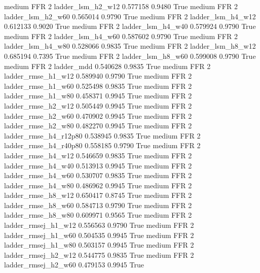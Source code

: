     medium      FFR                 2      ladder_lsm_h2_w12   0.577158      0.9480    True
    medium      FFR                 2      ladder_lsm_h2_w60   0.565014      0.9790    True
    medium      FFR                 2      ladder_lsm_h4_w12   0.612133      0.9020    True
    medium      FFR                 2      ladder_lsm_h4_w40   0.579924      0.9790    True
    medium      FFR                 2      ladder_lsm_h4_w60   0.587602      0.9790    True
    medium      FFR                 2      ladder_lsm_h4_w80   0.528066      0.9835    True
    medium      FFR                 2      ladder_lsm_h8_w12   0.685194      0.7395    True
    medium      FFR                 2      ladder_lsm_h8_w60   0.599008      0.9790    True
    medium      FFR                 2             ladder_mdd   0.540628      0.9835    True
    medium      FFR                 2     ladder_rmse_h1_w12   0.589940      0.9790    True
    medium      FFR                 2     ladder_rmse_h1_w60   0.525498      0.9835    True
    medium      FFR                 2     ladder_rmse_h1_w80   0.458371      0.9945    True
    medium      FFR                 2     ladder_rmse_h2_w12   0.505449      0.9945    True
    medium      FFR                 2     ladder_rmse_h2_w60   0.470902      0.9945    True
    medium      FFR                 2     ladder_rmse_h2_w80   0.482270      0.9945    True
    medium      FFR                 2  ladder_rmse_h4_r12p80   0.538945      0.9835    True
    medium      FFR                 2  ladder_rmse_h4_r40p80   0.558185      0.9790    True
    medium      FFR                 2     ladder_rmse_h4_w12   0.546659      0.9835    True
    medium      FFR                 2     ladder_rmse_h4_w40   0.513913      0.9945    True
    medium      FFR                 2     ladder_rmse_h4_w60   0.530707      0.9835    True
    medium      FFR                 2     ladder_rmse_h4_w80   0.486962      0.9945    True
    medium      FFR                 2     ladder_rmse_h8_w12   0.650417      0.8745    True
    medium      FFR                 2     ladder_rmse_h8_w60   0.584713      0.9790    True
    medium      FFR                 2     ladder_rmse_h8_w80   0.609971      0.9565    True
    medium      FFR                 2    ladder_rmsej_h1_w12   0.556563      0.9790    True
    medium      FFR                 2    ladder_rmsej_h1_w60   0.504535      0.9945    True
    medium      FFR                 2    ladder_rmsej_h1_w80   0.503157      0.9945    True
    medium      FFR                 2    ladder_rmsej_h2_w12   0.544775      0.9835    True
    medium      FFR                 2    ladder_rmsej_h2_w60   0.479153      0.9945    True
